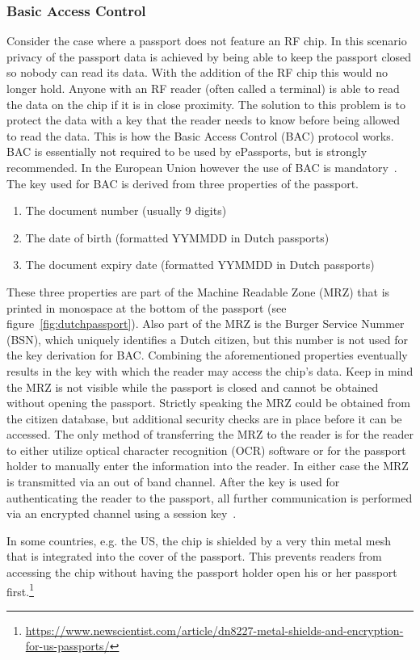 \subsubsection{Basic Access Control}
Consider the case where a passport does not feature an RF chip. In this scenario privacy of the passport data is achieved by being able to keep the passport closed so nobody can read its data. With the addition of the RF chip this would no longer hold. Anyone with an RF reader (often called a terminal) is able to read the data on the chip if it is in close proximity. The solution to this problem is to protect the data with a key that the reader needs to know before being allowed to read the data. This is how the Basic Access Control (BAC) protocol works. BAC is essentially not required to be used by ePassports, but is strongly recommended. In the European Union however the use of BAC is mandatory~\cite{icao}. The key used for BAC is derived from three properties of the passport.
\begin{enumerate}
	\item The document number (usually 9 digits)
  \item The date of birth (formatted YYMMDD in Dutch passports)
  \item The document expiry date (formatted YYMMDD in Dutch passports)
\end{enumerate}
These three properties are part of the Machine Readable Zone (MRZ) that is printed in monospace at the bottom of the passport (see figure~\ref{fig:dutchpassport}). Also part of the MRZ is the Burger Service Nummer (BSN), which uniquely identifies a Dutch citizen, but this number is not used for the key derivation for BAC. Combining the aforementioned properties eventually results in the key with which the reader may access the chip's data. Keep in mind the MRZ is not visible while the passport is closed and cannot be obtained without opening the passport. Strictly speaking the MRZ could be obtained from the citizen database, but additional security checks are in place before it can be accessed. The only method of transferring the MRZ to the reader is for the reader to either utilize optical character recognition (OCR) software or for the passport holder to manually enter the information into the reader. In either case the MRZ is transmitted via an out of band channel. After the key is used for authenticating the reader to the passport, all further communication is performed via an encrypted channel using a session key~\cite{icao}.

In some countries, e.g. the US, the chip is shielded by a very thin metal mesh that is integrated into the cover of the passport. This prevents readers from accessing the chip without having the passport holder open his or her passport first.\footnote{\url{https://www.newscientist.com/article/dn8227-metal-shields-and-encryption-for-us-passports/}}

